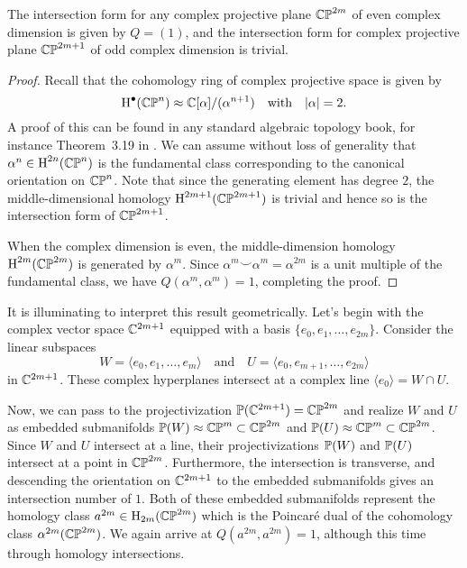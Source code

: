 \begin{proposition}\label{prop:intersection-form-complex-projective-plane}
	The intersection form for any complex projective plane $\CP^{2m}$ of even complex dimension is given by $Q=(1)$, and the intersection form for complex projective plane $\CP^{2m+1}$ of odd complex dimension is trivial.
\end{proposition}
\begin{proof}
	Recall that the cohomology ring of complex projective space is given by
	\begin{equation}
		\H^\bullet(\CP^{n}) \approx \C[\alpha]/(\alpha^{n+1})\quad\textrm{with}\quad |\alpha|=2.
	\end{equation}
	A proof of this can be found in any standard algebraic topology book, for instance Theorem~3.19 in \cite{hatcher2002topology}. We can assume without loss of generality that $\alpha^n\in \H^{2n}(\CP^n)$ is the fundamental class corresponding to the canonical orientation on $\CP^n$.
	Note that since the generating element has degree $2$, the middle-dimensional homology $\H^{2m+1}(\CP^{2m+1})$ is trivial and hence so is the intersection form of $\CP^{2m+1}$.

	When the complex dimension is even, the middle-dimension homology $\H^{2m}(\CP^{2m})$ is generated by $\alpha^m$. Since $\alpha^m\smile \alpha^m=\alpha^{2m}$ is a unit multiple of the fundamental class, we have $Q(\alpha^m, \alpha^m)=1$, completing the proof.
\end{proof}

It is illuminating to interpret this result geometrically. Let's begin with the complex vector space $\C^{2m+1}$ equipped with a basis $\{e_0, e_1,\ldots, e_{2m}\}$. Consider the linear subspaces
\begin{equation}
	W = \langle e_0, e_1,\ldots, e_m\rangle \quad\textrm{and}\quad U = \langle e_0, e_{m+1},\ldots, e_{2m}\rangle
\end{equation}
in $\C^{2m+1}$. These complex hyperplanes intersect at a complex line $\langle e_0 \rangle = W\cap U$.

Now, we can pass to the projectivization $\P(\C^{2m+1})=\CP^{2m}$ and realize $W$ and $U$ as embedded submanifolds $\P(W)\approx \CP^m\subset \CP^{2m}$ and $\P(U)\approx \CP^m\subset \CP^{2m}$. Since $W$ and $U$ intersect at a line, their projectivizations $\P(W)$ and $\P(U)$ intersect at a point in $\CP^{2m}$. Furthermore, the intersection is transverse, and descending the orientation on $\C^{2m+1}$ to the embedded submanifolds gives an intersection number of $1$. Both of these embedded submanifolds represent the homology class $a^{2m}\in \H_{2m}(\CP^{2m})$ which is the Poincar\'e dual of the cohomology class $\alpha^{2m}(\CP^{2m})$. We again arrive at $Q(a^{2m}, a^{2m})=1$, although this time through homology intersections.

